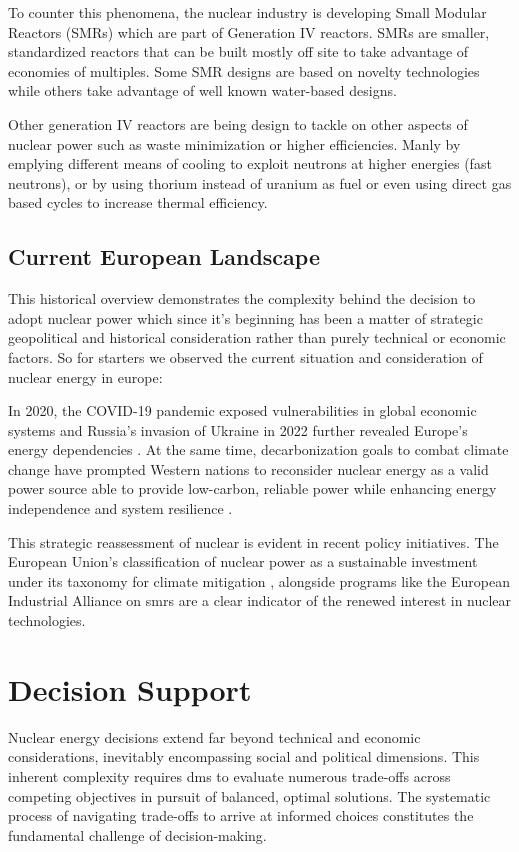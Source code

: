 To counter this phenomena, the nuclear industry is developing Small Modular Reactors (SMRs) which are part of Generation IV reactors. SMRs are smaller, standardized reactors that can be built mostly off site to take advantage of economies of multiples. Some SMR designs are based on novelty technologies while others take advantage of well known water-based designs. 

Other generation IV reactors are being design to tackle on other aspects of nuclear power such as waste minimization or higher efficiencies. Manly by emplying different means of cooling to exploit neutrons at higher energies (fast neutrons), or by using thorium instead of uranium as fuel or even using direct gas based cycles to increase thermal efficiency.

\subsection{Current European Landscape}
This historical overview demonstrates the complexity behind the decision to adopt nuclear power which since it's beginning has been a matter of strategic geopolitical and historical consideration rather than purely technical or economic factors. So for starters we observed the current situation and consideration of nuclear energy in europe:

In 2020, the COVID-19 pandemic exposed vulnerabilities in global economic systems and Russia's invasion of Ukraine in 2022 further revealed Europe's energy dependencies \cite{BRODNY2023121443, Sterling_European_Energy_Import_2025, EPRS_Energy_2023}. At the same time, decarbonization goals to combat climate change have prompted Western nations to reconsider nuclear energy as a valid power source able to provide low-carbon, reliable power while enhancing energy independence and system resilience \cite{EU2050ClimateStrategy}.

This strategic reassessment of nuclear is evident in recent policy initiatives. The European Union's classification of nuclear power as a sustainable investment under its taxonomy for climate mitigation \cite{EUTaxonomy}, alongside programs like the European Industrial Alliance on \glspl{smr} are a clear indicator of the renewed interest in nuclear technologies.

\section{Decision Support}
Nuclear energy decisions extend far beyond technical and economic considerations, inevitably encompassing social and political dimensions. This inherent complexity requires \glspl{dm} to evaluate numerous trade-offs across competing objectives in pursuit of balanced, optimal solutions. The systematic process of navigating trade-offs to arrive at informed choices constitutes the fundamental challenge of decision-making.

